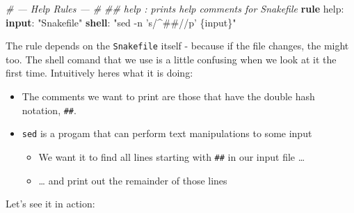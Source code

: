\documentclass[]{book}
\newenvironment{Shaded}{\begin{snugshade}}{\end{snugshade}}
\newcommand{\KeywordTok}[1]{\textcolor[rgb]{0.13,0.29,0.53}{\textbf{{#1}}}}
\newcommand{\StringTok}[1]{\textcolor[rgb]{0.31,0.60,0.02}{{#1}}}
\newcommand{\CommentTok}[1]{\textcolor[rgb]{0.56,0.35,0.01}{\textit{{#1}}}}
\newcommand{\NormalTok}[1]{{#1}}
\providecommand{\tightlist}{%
  \setlength{\itemsep}{0pt}\setlength{\parskip}{0pt}}
\theoremstyle{definition}
\theoremstyle{definition}
\theoremstyle{definition}
\theoremstyle{remark}
\begin{document}
\begin{Shaded}
\begin{Highlighting}[]
\CommentTok{# --- Help Rules --- #}
\CommentTok{## help               : prints help comments for Snakefile}
\KeywordTok{rule} \NormalTok{help:}
    \KeywordTok{input}\NormalTok{: }\StringTok{"Snakefile"}
    \KeywordTok{shell}\NormalTok{:}
        \StringTok{"sed -n 's/^##//p' \{input\}"}
\end{Highlighting}
\end{Shaded}

The rule depends on the \texttt{Snakefile} itself - because if the file
changes, the might too. The shell comand that we use is a little
confusing when we look at it the first time. Intuitively heres what it
is doing:

\begin{itemize}
\tightlist
\item
  The comments we want to print are those that have the double hash
  notation, \texttt{\#\#}.
\item
  \texttt{sed} is a progam that can perform text manipulations to some
  input

  \begin{itemize}
  \tightlist
  \item
    We want it to find all lines starting with \texttt{\#\#} in our
    input file \ldots{}
  \item
    \ldots{} and print out the remainder of those lines
  \end{itemize}
\end{itemize}

Let's see it in action:

\begin{Shaded}
\end{Shaded}
\end{document}

